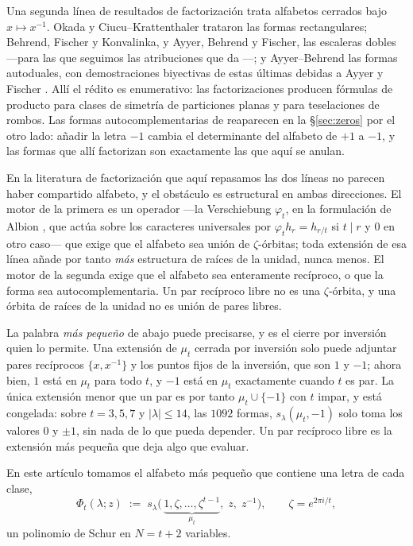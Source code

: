 \documentclass[11pt,reqno]{amsart}
\theoremstyle{plain}
\theoremstyle{definition}
\newcommand{\zt}{\mu_t}
\begin{document}
Una segunda línea de resultados de factorización trata alfabetos cerrados bajo $x\mapsto x^{-1}$.
Okada \cite{Oka98} y Ciucu--Krattenthaler \cite{CK09} trataron las formas rectangulares; Behrend,
Fischer y Konvalinka, y Ayyer, Behrend y Fischer, las escaleras dobles ---para las que seguimos las
atribuciones que da \cite{AB19}---; y Ayyer--Behrend \cite{AB19} las formas autoduales, con
demostraciones biyectivas de estas últimas debidas a Ayyer y Fischer \cite{AF20}. Allí el rédito es
enumerativo: las factorizaciones producen fórmulas de producto para clases de simetría de particiones
planas y para teselaciones de rombos. Las formas autocomplementarias de \cite{AB19} reaparecen en la
\S\ref{sec:zeros} por el otro lado: añadir la letra $-1$ cambia el determinante del alfabeto de $+1$
a $-1$, y las formas que allí factorizan son exactamente las que aquí se anulan.

En la literatura de factorización que aquí repasamos las dos líneas no parecen haber compartido
alfabeto, y el obstáculo es estructural en ambas direcciones. El
motor de la primera es un operador ---la Verschiebung $\varphi_t$, en la formulación de Albion
\cite{Alb23}, que actúa sobre los caracteres universales por $\varphi_t h_r=h_{r/t}$ si $t\mid r$ y
$0$ en otro caso--- que exige que el alfabeto sea unión de $\zeta$-órbitas; toda extensión de esa
línea añade por tanto \emph{más} estructura de raíces de la unidad, nunca menos. El motor de la
segunda exige que el alfabeto sea enteramente recíproco, o que la forma sea autocomplementaria. Un
par recíproco libre no es una $\zeta$-órbita, y una órbita de raíces de la unidad no es unión de
pares libres.

La palabra \emph{más pequeño} de abajo puede precisarse, y es el cierre por inversión quien lo
permite. Una extensión de $\zt$ cerrada por inversión solo puede adjuntar pares recíprocos
$\{x,x^{-1}\}$ y los puntos fijos de la inversión, que son $1$ y $-1$; ahora bien, $1$ está en $\zt$
para todo $t$, y $-1$ está en $\zt$ exactamente cuando $t$ es par. La única extensión menor que un
par es por tanto $\zt\cup\{-1\}$ con $t$ impar, y está congelada: sobre $t=3,5,7$ y
$|\lambda|\le14$, las $1092$ formas, $s_\lambda(\zt,-1)$ solo toma los valores $0$ y $\pm1$, sin
nada de lo que pueda depender. Un par recíproco libre es la extensión más pequeña que deja algo que
evaluar.

En este artículo tomamos el alfabeto más pequeño que contiene una letra de cada clase,
\begin{equation}\label{eq:object}
\Phi_t(\lambda;z)\;:=\;s_\lambda\bigl(\,\underbrace{1,\zeta,\dots,\zeta^{t-1}}_{\zt},\;z,\;z^{-1}\bigr),
\qquad \zeta=e^{2\pi i/t},
\end{equation}
un polinomio de Schur en $N=t+2$ variables.
\end{document}
